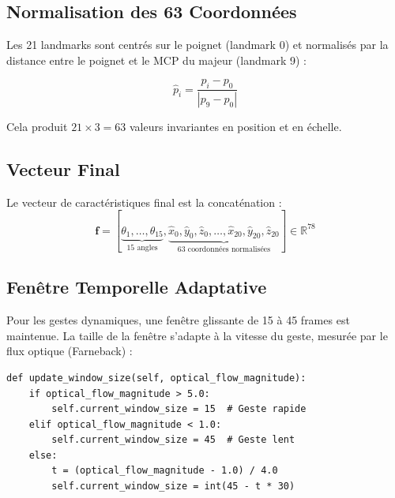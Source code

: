 \subsection{Normalisation des 63 Coordonnées}

Les 21 landmarks sont centrés sur le poignet (landmark 0) et normalisés par la distance entre le poignet et le MCP du majeur (landmark 9) :

\begin{equation}
    \hat{p}_i = \frac{p_i - p_0}{|p_9 - p_0|}
\end{equation}

Cela produit $21 \times 3 = 63$ valeurs invariantes en position et en échelle.

\subsection{Vecteur Final}

Le vecteur de caractéristiques final est la concaténation :
\begin{equation}
    \mathbf{f} = [\underbrace{\theta_1, \ldots, \theta_{15}}_{\text{15 angles}}, \underbrace{\hat{x}_0, \hat{y}_0, \hat{z}_0, \ldots, \hat{x}_{20}, \hat{y}_{20}, \hat{z}_{20}}_{\text{63 coordonnées normalisées}}] \in \mathbb{R}^{78}
\end{equation}

\subsection{Fenêtre Temporelle Adaptative}

Pour les gestes dynamiques, une fenêtre glissante de 15 à 45 frames est maintenue. La taille de la fenêtre s'adapte à la vitesse du geste, mesurée par le flux optique (Farneback) :

\begin{lstlisting}[style=python, caption={Fenêtre adaptative basée sur le flux optique}]
def update_window_size(self, optical_flow_magnitude):
    if optical_flow_magnitude > 5.0:
        self.current_window_size = 15  # Geste rapide
    elif optical_flow_magnitude < 1.0:
        self.current_window_size = 45  # Geste lent
    else:
        t = (optical_flow_magnitude - 1.0) / 4.0
        self.current_window_size = int(45 - t * 30)
\end{lstlisting}

